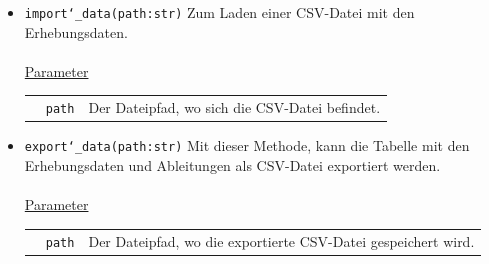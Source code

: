 \documentclass{article}
\begin{document}
\begin{itemize}
\item \texttt{import\char`_data(path:str)} \newline Zum Laden einer CSV-Datei mit den Erhebungsdaten.
\\\\
\underline{{Parameter}}\\
\begin{tabular}{lll}
 & \texttt{path} & Der Dateipfad, wo sich die CSV-Datei befindet.\\
\end{tabular}


\item \texttt{export\char`_data(path:str)} \newline Mit dieser Methode, kann die Tabelle mit den Erhebungsdaten und Ableitungen als CSV-Datei exportiert werden.
\\\\
\underline{{Parameter}}\\
\begin{tabular}{lll}
 & \texttt{path} & Der Dateipfad, wo die exportierte CSV-Datei gespeichert wird. \\
\end{tabular}
\end{itemize}
\end{document}
